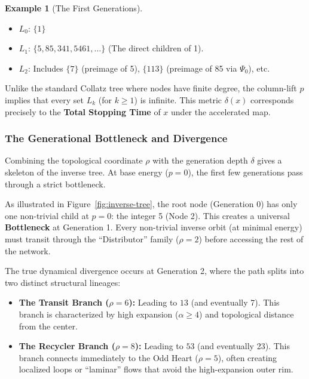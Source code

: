\documentclass[11pt,letterpaper]{amsart}
\def\mathbf#1{#1}%
\theoremstyle{definition}
\newtheorem{example}{Example}
\theoremstyle{plain}
\theoremstyle{plain}
\theoremstyle{remark}
\begin{document}
\begin{example}[The First Generations]
\begin{itemize}
    \item $\mathbf{L_0}$: $\{1\}$
    \item $\mathbf{L_1}$: $\{5, 85, 341, 5461, \dots\}$ (The direct children of 1).
    \item $\mathbf{L_2}$: Includes $\{7\}$ (preimage of 5), $\{113\}$ (preimage of 85 via $\Psi_0$), etc.
\end{itemize}
Unlike the standard Collatz tree where nodes have finite degree, the column-lift $p$ implies that every set $L_k$ (for $k \ge 1$) is infinite. This metric $\delta(x)$ corresponds precisely to the \textbf{Total Stopping Time} of $x$ under the accelerated map.
\end{example}

\subsubsection{The Generational Bottleneck and Divergence}

Combining the topological coordinate $\rho$ with the generation depth $\delta$ gives a skeleton of the inverse tree.  At base energy ($p=0$), the first few generations pass through a strict bottleneck.

As illustrated in Figure~\ref{fig:inverse-tree}, the root node (Generation 0) has only one non-trivial child at $p=0$: the integer 5 (Node 2). This creates a universal \textbf{Bottleneck} at Generation 1. Every non-trivial inverse orbit (at minimal energy) must transit through the ``Distributor'' family ($\rho=2$) before accessing the rest of the network.

The true dynamical divergence occurs at Generation 2, where the path splits into two distinct structural lineages:
\begin{itemize}
    \item \textbf{The Transit Branch ($\rho=6$):} Leading to $13$ (and eventually 7). This branch is characterized by high expansion ($\alpha \ge 4$) and topological distance from the center.
    \item \textbf{The Recycler Branch ($\rho=8$):} Leading to $53$ (and eventually 23). This branch connects immediately to the Odd Heart ($\rho=5$), often creating localized loops or ``laminar'' flows that avoid the high-expansion outer rim.
\end{itemize}
\end{document}
